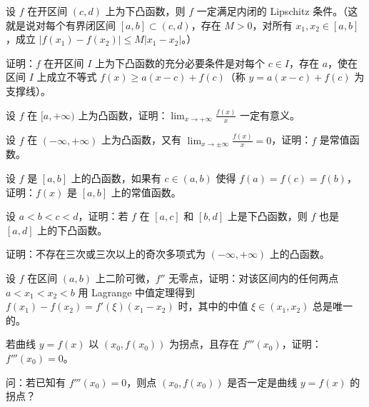 \begin{xexercise}[10]
设 $f$ 在开区间 $(c,d)$ 上为下凸函数，则 $f$ 一定满足内闭的 Lipschitz 条件。（这就是说对每个有界闭区间 $[a,b]\subset(c,d)$，存在 $M>0$，对所有 $x_1,x_2\in[a,b]$，成立 $|f(x_1)-f(x_2)|\le M|x_1-x_2|$。）
\end{xexercise}

\begin{xexercise}[11]
证明：$f$ 在开区间 $I$ 上为下凸函数的充分必要条件是对每个 $c\in I$，存在 $a$，使在区间 $I$ 上成立不等式 $f(x)\ge a(x-c)+f(c)$（称 $y=a(x-c)+f(c)$ 为支撑线）。
\end{xexercise}

\begin{xexercise}[12]
设 $f$ 在 $[a,+\infty)$ 上为凸函数，证明：$\displaystyle\lim_{x\to+\infty}\frac{f(x)}x$ 一定有意义。
\end{xexercise}

\begin{xexercise}[13]
设 $f$ 在 $(-\infty,+\infty)$ 上为凸函数，又有 $\displaystyle\lim_{x\to\pm\infty}\frac{f(x)}x=0$，证明：$f$ 是常值函数。
\end{xexercise}

\begin{xexercise}[14]
设 $f$ 是 $[a,b]$ 上的凸函数，如果有 $c\in(a,b)$ 使得 $f(a)=f(c)=f(b)$，证明：$f(x)$ 是 $[a,b]$ 上的常值函数。
\end{xexercise}

\begin{xexercise}[15]
设 $a<b<c<d$，证明：若 $f$ 在 $[a,c]$ 和 $[b,d]$ 上是下凸函数，则 $f$ 也是 $[a,d]$ 上的下凸函数。
\end{xexercise}

\begin{xexercise}[16]
证明：不存在三次或三次以上的奇次多项式为 $(-\infty,+\infty)$ 上的凸函数。
\end{xexercise}

\begin{xexercise}[17]
设 $f$ 在区间 $(a,b)$ 上二阶可微，$f''$ 无零点，证明：对该区间内的任何两点 $a<x_1<x_2<b$ 用 Lagrange 中值定理得到 $f(x_1)-f(x_2)=f'(\xi)(x_1-x_2)$ 时，其中的中值 $\xi\in(x_1,x_2)$ 总是唯一的。
\end{xexercise}

\begin{xexercise}[18]
若曲线 $y=f(x)$ 以 $(x_0,f(x_0))$ 为拐点，且存在 $f'''(x_0)$，证明：$f'''(x_0)=0$。
\end{xexercise}

\begin{xexercise}[19]
问：若已知有 $f'''(x_0)=0$，则点 $(x_0,f(x_0))$ 是否一定是曲线 $y=f(x)$ 的拐点？
\end{xexercise}

